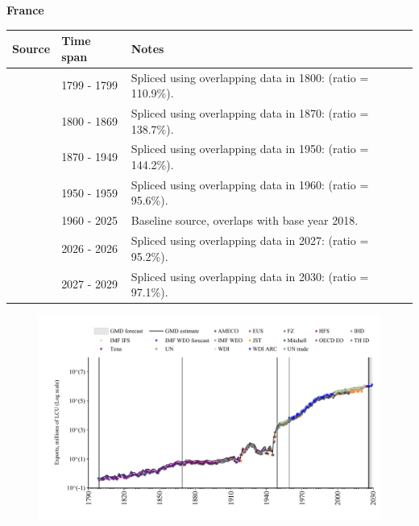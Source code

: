 \documentclass[12pt,a4paper,landscape]{article}
\begin{document}
\begin{adjustbox}{max totalsize={\paperwidth}{\paperheight},center}
\begin{minipage}[t][\textheight][t]{\textwidth}
\vspace*{0.5cm}
{}
\begin{center}
{\Large\bfseries France}
\end{center}
\vspace{0.5cm}
\begin{table}[H]
\centering
\small
\begin{tabular}{|l|l|l|}
\hline
\textbf{Source} & \textbf{Time span} & \textbf{Notes} \\
\hline
\rowcolor{white}\cite{Mitchell}& 1799 - 1799 &Spliced using overlapping data in 1800: (ratio = 110.9\%).\\
\rowcolor{lightgray}\cite{Tena}& 1800 - 1869 &Spliced using overlapping data in 1870: (ratio = 138.7\%).\\
\rowcolor{white}\cite{JST}& 1870 - 1949 &Spliced using overlapping data in 1950: (ratio = 144.2\%).\\
\rowcolor{lightgray}\cite{IMF_IFS}& 1950 - 1959 &Spliced using overlapping data in 1960: (ratio = 95.6\%).\\
\rowcolor{white}\cite{OECD_EO}& 1960 - 2025 &Baseline source, overlaps with base year 2018.\\
\rowcolor{lightgray}\cite{AMECO}& 2026 - 2026 &Spliced using overlapping data in 2027: (ratio = 95.2\%).\\
\rowcolor{white}\cite{IMF_WEO_forecast}& 2027 - 2029 &Spliced using overlapping data in 2030: (ratio = 97.1\%).\\
\hline
\end{tabular}
\end{table}
\begin{figure}[H]
\centering
\includegraphics[width=\textwidth,height=0.6\textheight,keepaspectratio]{graphs/FRA_exports.pdf}
\end{figure}
\end{minipage}
\end{adjustbox}
\end{document}

